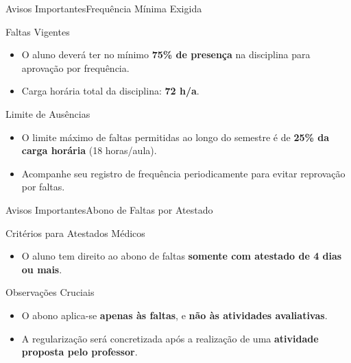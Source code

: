 \documentclass[9pt]{beamer}
\begin{document}
\begin{frame}{Avisos Importantes}{Frequência Mínima Exigida}
  \begin{block}{Faltas Vigentes}
    \begin{itemize}
      \item O aluno deverá ter no mínimo \textbf{75\% de presença} na disciplina para aprovação por frequência.
      \item Carga horária total da disciplina: \textbf{72 h/a}.
    \end{itemize}
  \end{block}

  \begin{exampleblock}{Limite de Ausências}
    \begin{itemize}
      \item O limite máximo de faltas permitidas ao longo do semestre é de \textbf{25\% da carga horária} (18 horas/aula).
      \item Acompanhe seu registro de frequência periodicamente para evitar reprovação por faltas.
    \end{itemize}
  \end{exampleblock}
\end{frame}

\begin{frame}{Avisos Importantes}{Abono de Faltas por Atestado}
  \begin{block}{Critérios para Atestados Médicos}
    \begin{itemize}
      \item O aluno tem direito ao abono de faltas \textbf{somente com atestado de 4 dias ou mais}.
    \end{itemize}
  \end{block}

  \begin{alertblock}{Observações Cruciais}
    \begin{itemize}
      \item O abono aplica-se \textbf{apenas às faltas}, e \textbf{não às atividades avaliativas}.
      \item A regularização será concretizada após a realização de uma \textbf{atividade proposta pelo professor}.
    \end{itemize}
  \end{alertblock}
\end{frame}
\end{document}
